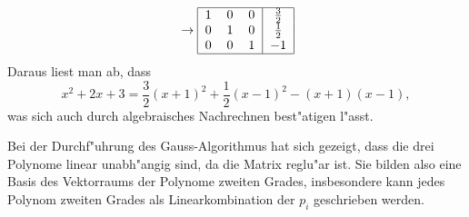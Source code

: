 \begin{loesung}
\begin{teilaufgaben}
\begin{align*}
\begin{tabular}{|ccc|c|}
\hline
\end{tabular}
\rightarrow
\begin{tabular}{|ccc|c|}
\hline
1&0&0&$\frac32$\\
0&1&0&$\frac12$\\
0&0&1&$-1$\\
\hline
\end{tabular}
\end{align*}
Daraus liest man ab, dass
\[
x^2+2x+3=\frac32(x+1)^2+\frac12(x-1)^2-(x+1)(x-1),
\]
was sich auch durch algebraisches Nachrechnen best"atigen l"asst.
\item
Bei der Durchf"uhrung des Gauss-Algorithmus hat sich gezeigt, dass
die drei Polynome linear unabh"angig sind, da die Matrix reglu"ar
ist. Sie bilden also eine Basis des Vektorraums der Polynome zweiten
Grades, insbesondere kann jedes Polynom zweiten Grades als Linearkombination
der $p_i$ geschrieben werden.
\end{teilaufgaben}
\end{loesung}

